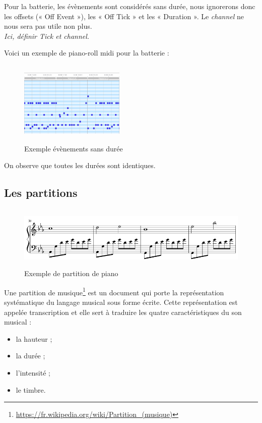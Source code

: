 Pour la batterie, les évènements sont considérés sans durée, nous ignorerons donc les offsets (« Off Event »), les « Off Tick » et les « Duration ». Le \textit{channel} ne nous sera pas utile non plus.\\
\textit{Ici, définir Tick et channel.}

Voici un exemple de piano-roll midi pour la batterie :
\begin{figure}[h!]
	\centering
	\includegraphics[height=40mm, width=50mm]{z_images/1_contexte/4_midi_batterie.png}
	\caption{Exemple évènements sans durée}
\end{figure}

On observe que toutes les durées sont identiques.
\subsection*{Les partitions}
\begin{figure}[h!]
	\centering
	\includegraphics[height=30mm, width=120mm]{z_images/1_contexte/5_partition_piano.png}
	\caption{Exemple de partition de piano}
\end{figure}

Une partition de musique\footnote{\url{https://fr.wikipedia.org/wiki/Partition\_(musique)}} est un document qui porte la représentation systématique du langage musical sous forme écrite. Cette représentation est appelée transcription et elle sert à traduire les quatre caractéristiques du son musical :
\begin{itemize}
	\item la hauteur ;
	\item la durée ;
	\item l'intensité ;
	\item le timbre.
\end{itemize}

